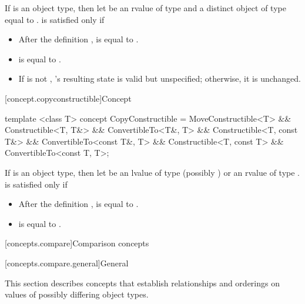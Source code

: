 \begin{itemdescr}
\pnum
If  is an object type, then let  be an rvalue of type
 and  a distinct object of type  equal to
.  is satisfied only if

\begin{itemize}
\item After the definition ,  is equal to .

\item {} is equal to .

\item If  is not , 's resulting state is valid
but unspecified; otherwise, it is unchanged.
\end{itemize}
\end{itemdescr}

[concept.copyconstructible]{Concept }

%
\begin{itemdecl}
template <class T>
concept CopyConstructible = MoveConstructible<T> &&
  Constructible<T, T&> && ConvertibleTo<T&, T> &&
  Constructible<T, const T&> && ConvertibleTo<const T&, T> &&
  Constructible<T, const T> && ConvertibleTo<const T, T>;
\end{itemdecl}

\begin{itemdescr}
\pnum
If  is an object type, then let  be an lvalue of type
(possibly )  or an rvalue of type .
 is satisfied only if

\begin{itemize}
\item After the definition ,  is equal to .

\item {} is equal to .
\end{itemize}

\end{itemdescr}

[concepts.compare]{Comparison concepts}

[concepts.compare.general]{General}

\pnum
This section describes concepts that establish relationships and orderings
on values of possibly differing object types.

